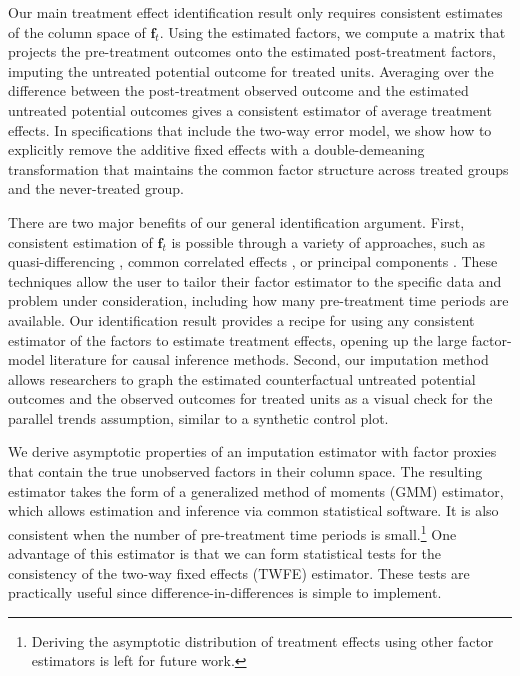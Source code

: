 \documentclass[12pt]{article}
\begin{document}
Our main treatment effect identification result only requires consistent estimates of the column space of $\bm f_t$. Using the estimated factors, we compute a matrix that projects the pre-treatment outcomes onto the estimated post-treatment factors, imputing the untreated potential outcome for treated units. Averaging over the difference between the post-treatment observed outcome and the estimated untreated potential outcomes gives a consistent estimator of average treatment effects. In specifications that include the two-way error model, we show how to explicitly remove the additive fixed effects with a double-demeaning transformation that maintains the common factor structure across treated groups and the never-treated group.

There are two major benefits of our general identification argument. First, consistent estimation of $\bm f_t$ is possible through a variety of approaches, such as quasi-differencing \citep{Ahn_Lee_Schmidt_2013,Callaway_Karami_2020}, common correlated effects \citep{Pesaran_2006,Westerlund_Petrova_Norkute_2019}, or principal components \citep{Bai_2009,Fan_2016,Chan_and_Kwok_2022}. These techniques allow the user to tailor their factor estimator to the specific data and problem under consideration, including how many pre-treatment time periods are available. Our identification result provides a recipe for using any consistent estimator of the factors to estimate treatment effects, opening up the large factor-model literature for causal inference methods. Second, our imputation method allows researchers to graph the estimated counterfactual untreated potential outcomes and the observed outcomes for treated units as a visual check for the parallel trends assumption, similar to a synthetic control plot.

We derive asymptotic properties of an imputation estimator with factor proxies that contain the true unobserved factors in their column space. The resulting estimator takes the form of a generalized method of moments (GMM) estimator, which allows estimation and inference via common statistical software. It is also consistent when the number of pre-treatment time periods is small.\footnote{Deriving the asymptotic distribution of treatment effects using other factor estimators is left for future work.} One advantage of this estimator is that we can form statistical tests for the consistency of the two-way fixed effects (TWFE) estimator. These tests are practically useful since difference-in-differences is simple to implement. 
\end{document}
